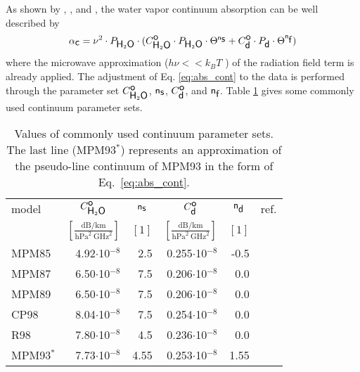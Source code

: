 {
\label{leveld:h2o_Cont}
As shown by \cite{liebeandlayton:87}, \cite{pwr:98}, and \cite{ma:90},
the water vapor continuum absorption can be well described by 
\begin{equation} 
  \label{eq:abs_cont}
  \alpha_{\mbox{\sf c}} = \nu^2 \cdot P_{\mbox{\sf H}_{2}\mbox{\sf O}} \cdot 
            (C^{\mbox{\sf o}}_{\mbox{\sf H}_{2}\mbox{\sf O}} \cdot P_{\mbox{\sf H}_{2}\mbox{\sf O}} \cdot \Theta^{{\sf n}_{\mbox{\sf s}}} + 
             C^{\mbox{\sf o}}_{\mbox{\sf d}} \cdot P_{\mbox{\sf d}}  \cdot \Theta^{{\sf n}_{\mbox{\sf f}}})
\end{equation}
where the microwave approximation ($h\nu<<k_BT$ ) of the radiation field term 
is already applied. The adjustment of Eq. \ref{eq:abs_cont} to the data 
is performed through the parameter set $C^{\mbox{\sf o}}_{\mbox{\sf H}_{2}\mbox{\sf O}}$, ${\sf n}_{\mbox{\sf s}}$, $C^{\mbox{\sf o}}_{\mbox{\sf d}}$, and ${\sf n}_{\mbox{\sf f}}$. 
Table \ref{tab:wvcontparam} gives some commonly used continuum parameter sets.
\begin{table}[!hbt]
  \begin{center}
  \begin{tabular}{lrrrrr}
    \hline
    model  & \multicolumn{1}{c}{$C^{\mbox{\sf o}}_{\mbox{\sf H}_{2}\mbox{\sf O}}$} & 
             \multicolumn{1}{c}{${\sf n}_{\mbox{\sf s}}$}  & 
             \multicolumn{1}{c}{$C^{\mbox{\sf o}}_{\mbox{\sf d}}$} & 
             \multicolumn{1}{c}{${\sf n}_{\mbox{\sf d}}$}  & 
             ref.\\
           & \multicolumn{1}{c}{$\left[\frac{\mbox{dB/km}}
                               {\mbox{hPa}^2~\mbox{GHz}^2}\right]$} & 
             \multicolumn{1}{c}{$[1]$} & 
             \multicolumn{1}{c}{$\left[\frac{\mbox{dB/km}}
                               {\mbox{hPa}^2~\mbox{GHz}^2}\right]$} & 
             \multicolumn{1}{c}{$[1]$} & \\
    \hline
    MPM85  & 4.92$\cdot$10$^{-8}$ & 2.5 & 0.255$\cdot$10$^{-8}$  & -0.5 & \cite{liebe:84}\\
    MPM87  & 6.50$\cdot$10$^{-8}$ & 7.5 & 0.206$\cdot$10$^{-8}$  & 0.0 & \cite{liebeandlayton:87}\\
    MPM89  & 6.50$\cdot$10$^{-8}$ & 7.5 & 0.206$\cdot$10$^{-8}$  & 0.0 & \cite{liebe:89}\\
    CP98   & 8.04$\cdot$10$^{-8}$ & 7.5 & 0.254$\cdot$10$^{-8}$ & 0.0 & \cite{cruzpol:98}\\ 
    R98    & 7.80$\cdot$10$^{-8}$ & 4.5 & 0.236$\cdot$10$^{-8}$  & 0.0 & \cite{pwr:98}\\
    \hline
    MPM93$^*$ & 7.73$\cdot$10$^{-8}$ & 4.55 & 0.253$\cdot$10$^{-8}$  & 1.55 & \cite{liebeetal:93}\\
    \hline
 \end{tabular}
\end{center}
 \caption{Values of commonly used continuum parameter sets. The last line (MPM93$^*$)
   represents an approximation of the pseudo-line continuum of MPM93
   in the form of Eq.~\ref{eq:abs_cont}.}
 \label{tab:wvcontparam}
\end{table}




}
